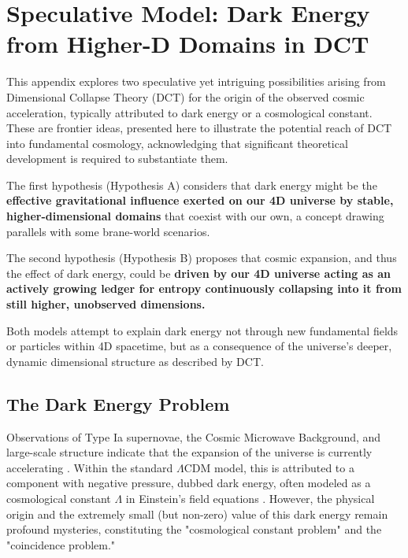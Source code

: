\documentclass[a4paper, 12pt, oneside]{book}
\numberwithin{equation}{chapter}
\begin{document}
\chapter[Speculation: Dark Energy]{Speculative Model: Dark Energy from Higher-D Domains in DCT}
\label{appendix:DarkEnergySpeculation}

\noindent
This appendix explores two speculative yet intriguing possibilities arising from Dimensional Collapse Theory (DCT) for the origin of the observed cosmic acceleration, typically attributed to dark energy or a cosmological constant. These are frontier ideas, presented here to illustrate the potential reach of DCT into fundamental cosmology, acknowledging that significant theoretical development is required to substantiate them.

The first hypothesis (Hypothesis A) considers that dark energy might be the \textbf{effective gravitational influence exerted on our 4D universe by stable, higher-dimensional domains} that coexist with our own, a concept drawing parallels with some brane-world scenarios.

The second hypothesis (Hypothesis B) proposes that cosmic expansion, and thus the effect of dark energy, could be \textbf{driven by our 4D universe acting as an actively growing ledger for entropy continuously collapsing into it from still higher, unobserved dimensions.}

Both models attempt to explain dark energy not through new fundamental fields or particles within 4D spacetime, but as a consequence of the universe's deeper, dynamic dimensional structure as described by DCT.

\section{The Dark Energy Problem}
\label{sec:DEProblem}
Observations of Type Ia supernovae, the Cosmic Microwave Background, and large-scale structure indicate that the expansion of the universe is currently accelerating \cite{Riess1998, Perlmutter1999}. Within the standard $\Lambda$CDM model, this is attributed to a component with negative pressure, dubbed dark energy, often modeled as a cosmological constant $\Lambda$ in Einstein's field equations \cite{Carroll2001CosmologicalConstant, Copeland2006DarkEnergy}. However, the physical origin and the extremely small (but non-zero) value of this dark energy remain profound mysteries, constituting the "cosmological constant problem" and the "coincidence problem."
\end{document}
